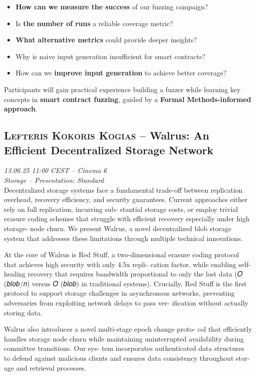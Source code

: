 \begin{itemize}
\item{} \textbf{How can we measure the success} of our fuzzing campaign?
\item{} Is \textbf{the number of runs} a reliable coverage metric?
\item{} \textbf{What alternative metrics} could provide deeper insights?
\item{} Why is naive input generation insufficient for smart contracts?
\item{} How can we \textbf{improve input generation} to achieve better coverage?
\end{itemize}

Participants will gain practical experience building a fuzzer while learning key concepts in \textbf{smart contract fuzzing}, guided by a \textbf{Formal Methods-informed approach}.

\clearpage
\subsection {\textsc{Lefteris Kokoris Kogias}  -- Walrus: An Efficient Decentralized Storage Network} \noindent \textit {13.06.25 11:00 CEST -- Cinema 6\\ Storage -- Presentation: Standard}\\[1em] Decentralized storage systems face a fundamental trade-off between
replication overhead, recovery efficiency, and security guarantees.
Current approaches either rely on full replication, incurring sub-
stantial storage costs, or employ trivial erasure coding schemes
that struggle with efficient recovery especially under high storage-
node churn. We present Walrus, a novel decentralized blob storage
system that addresses these limitations through multiple technical
innovations.

At the core of Walrus is Red Stuff, a two-dimensional erasure
coding protocol that achieves high security with only 4.5x repli-
cation factor, while enabling self-healing recovery that requires
bandwidth proportional to only the lost data (𝑂 (\textbar{}𝑏𝑙𝑜𝑏\textbar{}/𝑛) versus
𝑂 (\textbar{}𝑏𝑙𝑜𝑏\textbar{}) in traditional systems). Crucially, Red Stuff is the first
protocol to support storage challenges in asynchronous networks,
preventing adversaries from exploiting network delays to pass ver-
ification without actually storing data.

Walrus also introduces a novel multi-stage epoch change proto-
col that efficiently handles storage node churn while maintaining
uninterrupted availability during committee transitions. Our sys-
tem incorporates authenticated data structures to defend against
malicious clients and ensures data consistency throughout stor-
age and retrieval processes.


